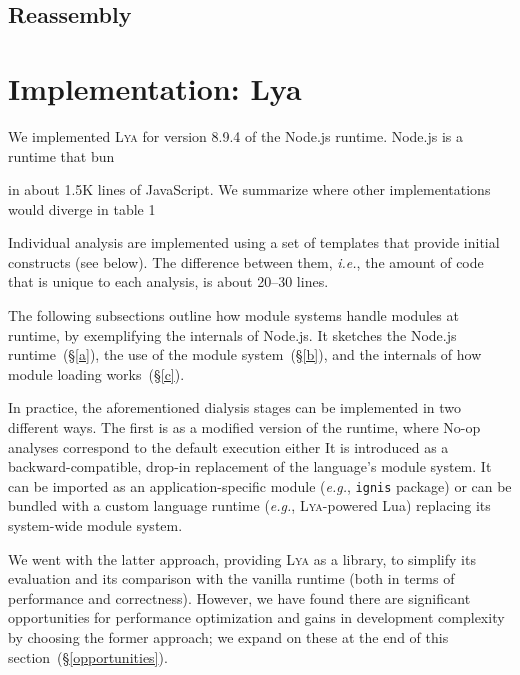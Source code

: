 \documentclass[letterpaper,twocolumn,10pt]{article}
\def\eg{{\em e.g.}, }
\def\ie{{\em i.e.}, }
\newcommand{\ttt}[1]{\texttt{#1}}
\newcommand{\sx}[1]{(\S\ref{#1})}
\newcommand{\sys}{{\scshape Lya}\xspace}
\begin{document}
\subsection{Reassembly}
\label{three}




\section{Implementation: Lya}
\label{impl}

We implemented \sys for version 8.9.4 of the Node.js runtime.
Node.js is a runtime that bun

in about 1.5K lines of JavaScript.
We summarize where other implementations would diverge in table 1

Individual analysis are implemented using a set of templates that provide initial constructs (see below).
The difference between them, \ie the amount of code that is unique to each analysis, is about 20--30 lines.

The following subsections outline how module systems handle modules at runtime, by exemplifying the internals of Node.js.
It sketches the Node.js runtime~\sx{a}, the use of the module system~\sx{b}, and the internals of how module loading works~\sx{c}.

In practice, the aforementioned dialysis stages can be implemented in two different ways.
The first is as a modified version of the runtime, where 
No-op analyses correspond to the default execution
  either 
It is introduced as a backward-compatible, drop-in replacement of the language's module system.
It can be imported as an application-specific module (\eg \ttt{ignis} package) or can be bundled with a custom language runtime (\eg \sys-powered Lua) replacing its system-wide module system.

We went with the latter approach, providing \sys as a library, to simplify its evaluation and its comparison with the vanilla runtime (both in terms of performance and correctness).
However, we have found there are significant opportunities for performance optimization and gains in development complexity by choosing the former approach;
  we expand on these at the end of this section~\sx{opportunities}.
\end{document}
